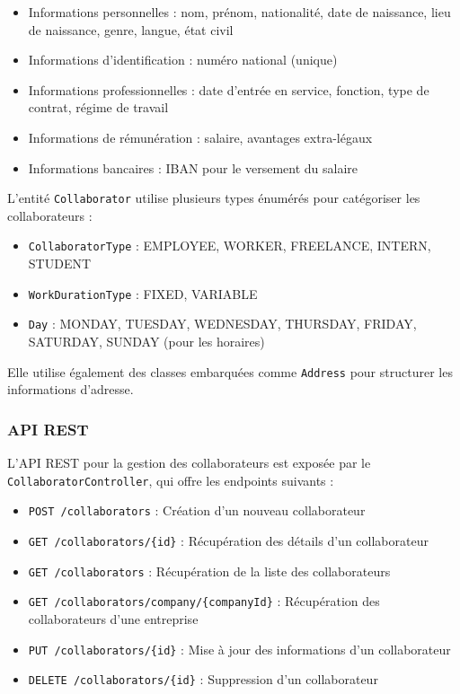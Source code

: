 \begin{itemize}
  \item Informations personnelles : nom, prénom, nationalité, date de naissance, lieu de naissance, genre, langue, état civil
  \item Informations d'identification : numéro national (unique)
  \item Informations professionnelles : date d'entrée en service, fonction, type de contrat, régime de travail
  \item Informations de rémunération : salaire, avantages extra-légaux
  \item Informations bancaires : IBAN pour le versement du salaire
\end{itemize}

L'entité \texttt{Collaborator} utilise plusieurs types énumérés pour catégoriser les collaborateurs :
\begin{itemize}
  \item \texttt{CollaboratorType} : EMPLOYEE, WORKER, FREELANCE, INTERN, STUDENT
  \item \texttt{WorkDurationType} : FIXED, VARIABLE
  \item \texttt{Day} : MONDAY, TUESDAY, WEDNESDAY, THURSDAY, FRIDAY, SATURDAY, SUNDAY (pour les horaires)
\end{itemize}

Elle utilise également des classes embarquées comme \texttt{Address} pour structurer les informations d'adresse.

\subsubsection{API REST}

L'API REST pour la gestion des collaborateurs est exposée par le \texttt{CollaboratorController}, qui offre les endpoints suivants :

\begin{itemize}
  \item \texttt{POST /collaborators} : Création d'un nouveau collaborateur
  \item \texttt{GET /collaborators/\{id\}} : Récupération des détails d'un collaborateur
  \item \texttt{GET /collaborators} : Récupération de la liste des collaborateurs
  \item \texttt{GET /collaborators/company/\{companyId\}} : Récupération des collaborateurs d'une entreprise
  \item \texttt{PUT /collaborators/\{id\}} : Mise à jour des informations d'un collaborateur
  \item \texttt{DELETE /collaborators/\{id\}} : Suppression d'un collaborateur
\end{itemize}

